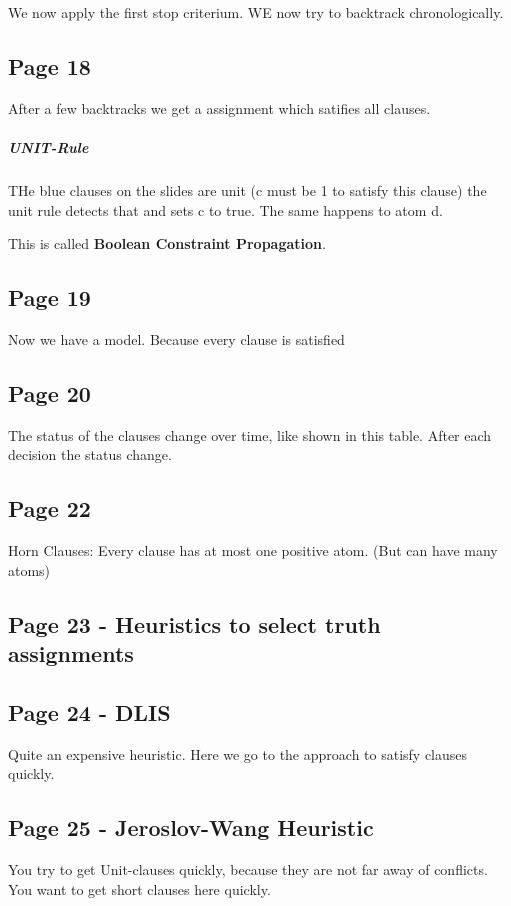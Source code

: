 \documentclass[a4paper]{article}
\newcommand{\tb}[1]{\textbf{#1}}
\begin{document}
We now apply the first stop criterium. WE now try to backtrack chronologically.


\subsection{Page 18}

After a few backtracks we get a assignment which satifies all clauses.

\subparagraph{UNIT-Rule} THe blue clauses on the slides are unit (c must be 1
to satisfy this clause) the unit rule detects that and sets c to true. The same
happens to atom d.

This is called \tb{Boolean Constraint Propagation}.

\subsection{Page 19}
Now we have a model. Because every clause is satisfied


\subsection{Page 20}
The status of the clauses change over time, like shown in this table. After
each decision the status change.


\subsection{Page 22}

Horn Clauses: Every clause has at most one positive atom. (But can have many
atoms)

\subsection{Page 23 - Heuristics to select truth assignments}
\subsection{Page 24 - DLIS}

Quite an expensive heuristic. Here we go to the approach to satisfy clauses
quickly.

\subsection{Page 25 - Jeroslov-Wang Heuristic}

You try to get Unit-clauses quickly, because they are not far away of conflicts.
You want to get short clauses here quickly.
\end{document}
